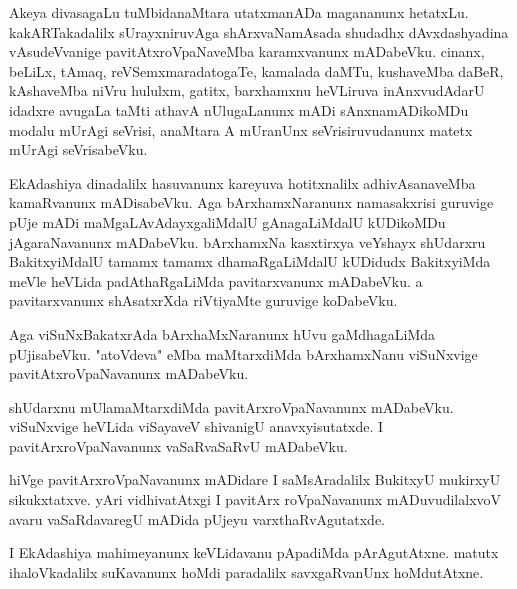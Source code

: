 \documentclass{article}
\begin{document}
\begin{mn}%
Akeya divasagaLu tuMbidanaMtara utatxmanADa magananunx hetatxLu. kakARTakadalilx sUrayxniruvAga 
shArxvaNamAsada shudadhx dAvxdashyadina vAsudeVvanige pavitAtxroVpaNaveMba karamxvanunx mADabeVku.
cinanx, beLiLx, tAmaq, reVSemxmaradatogaTe, kamalada daMTu, kushaveMba daBeR, kAshaveMba niVru 
hululxm, gatitx, barxhamxnu heVLiruva inAnxvudAdarU idadxre avugaLa taMti athavA nUlugaLanunx mADi 
sAnxnamADikoMDu modalu mUrAgi seVrisi, anaMtara A mUranUnx seVrisiruvudanunx matetx mUrAgi 
seVrisabeVku.
\end{mn}

\begin{mn}%
EkAdashiya dinadalilx hasuvanunx kareyuva hotitxnalilx adhivAsanaveMba kamaRvanunx mADisabeVku. Aga 
bArxhamxNaranunx namasakxrisi guruvige pUje mADi maMgaLAvAdayxgaliMdalU gAnagaLiMdalU kUDikoMDu 
jAgaraNavanunx mADabeVku. bArxhamxNa kasxtirxya veYshayx shUdarxru BakitxyiMdalU tamamx tamamx 
dhamaRgaLiMdalU kUDidudx BakitxyiMda meVle heVLida padAthaRgaLiMda pavitarxvanunx mADabeVku. a 
pavitarxvanunx shAsatxrXda riVtiyaMte guruvige koDabeVku.
\end{mn}

\begin{mn}%
Aga viSuNxBakatxrAda bArxhaMxNaranunx hUvu gaMdhagaLiMda pUjisabeVku. "atoVdeva" eMba maMtarxdiMda 
bArxhamxNanu viSuNxvige pavitAtxroVpaNavanunx mADabeVku.
\end{mn}

\begin{mn}%
shUdarxnu mUlamaMtarxdiMda pavitArxroVpaNavanunx mADabeVku. viSuNxvige heVLida viSayaveV shivanigU 
anavxyisutatxde. I pavitArxroVpaNavanunx vaSaRvaSaRvU mADabeVku.
\end{mn}

\begin{mn}%
hiVge pavitArxroVpaNavanunx mADidare I saMsAradalilx BukitxyU mukirxyU sikukxtatxve. yAri 
vidhivatAtxgi I pavitArx roVpaNavanunx mADuvudilalxvoV avaru vaSaRdavaregU mADida pUjeyu 
varxthaRvAgutatxde.
\end{mn}

\begin{mn}%
I EkAdashiya mahimeyanunx keVLidavanu pApadiMda pArAgutAtxne. matutx ihaloVkadalilx suKavanunx 
hoMdi paradalilx savxgaRvanUnx hoMdutAtxne.
\end{mn}

\end{document}
